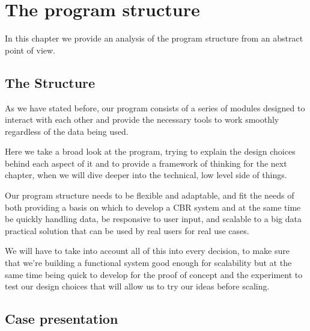 %
%

\chapter{The program structure}

\begin{resumen}
In this chapter we provide an analysis of the program structure from an abstract point of view.
\end{resumen}

\linespread{1.6}

\section{The Structure}
\label{cap2:sec:structure}

As we have stated before, our program consists of a series of modules designed to interact with each other and provide the necessary tools to work smoothly regardless of the data being used.

Here we take a broad look at the program, trying to explain the design choices behind each aspect of it and to provide a framework of thinking for the next chapter, when we will dive deeper into the technical, low level side of things.

Our program structure needs to be flexible and adaptable, and fit the needs of both providing a basis on which to develop a CBR system and at the same time be quickly handling data, be responsive to user input, and scalable to a big data practical solution that can be used by real users for real use cases.

We will have to take into account all of this into every decision, to make sure that we're building a functional system good enough for scalability but at the same time being quick to develop for the proof of concept and the experiment to test our design choices that will allow us to try our ideas before scaling.

\section{Case presentation}
\label{cap2:sec:preparation}

